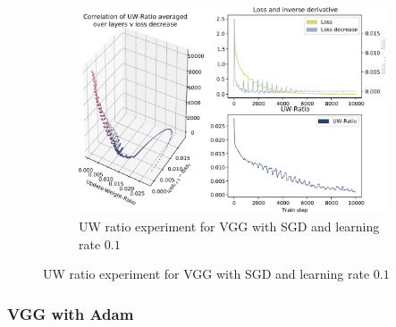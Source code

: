 \begin{figure}
    \begin{subfigure}{\textwidth}
        \centering
        \includegraphics[width=\linewidth]{gfx/diagrams/experiments/ratio_loss_correlation/vgg_sgd_01_0_10000.pdf}
        \caption{UW ratio experiment for VGG with SGD and learning rate $0.1$}
        \label{fig:ratio_loss_corr_vgg_sgd_01}
    \end{subfigure}
\end{figure}

\subsubsection{VGG with Adam}

